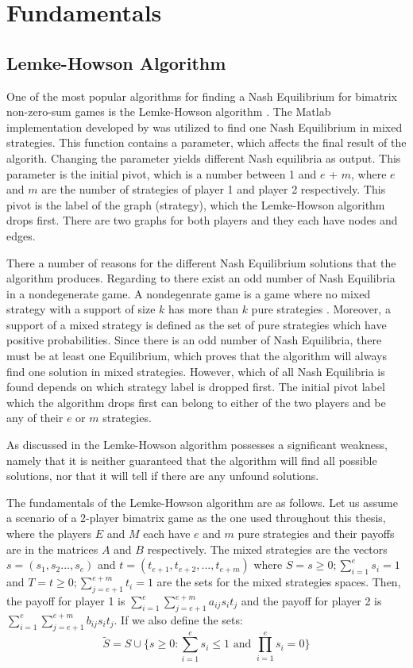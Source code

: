 \chapter{Fundamentals}
\label{chp:basics}

\section{Lemke-Howson Algorithm}
One of the most popular algorithms for finding a Nash Equilibrium for bimatrix non-zero-sum games is the Lemke-Howson algorithm \citep{lemke1964equilibrium}. The Matlab implementation developed by \citep{lemkeHowson2014Matlab} was utilized to find one Nash Equilibrium in mixed strategies. This function contains a parameter, which affects the final result of the algorith. Changing the parameter yields different Nash equilibria as output. This parameter is the initial pivot, which is a number between 1 and $e$ + $m$, where $e$ and $m$ are the number of strategies of player 1 and player 2 respectively. This pivot is the label of the graph (strategy), which the Lemke-Howson algorithm drops first. There are two graphs for both players and they each have nodes and edges.

There a number of reasons for the different Nash Equilibrium solutions that the algorithm produces. Regarding to \cite{lemke1964equilibrium} there exist an odd number of Nash Equilibria in a nondegenerate game. A nondegenrate game is a game where no mixed strategy with a support of size $k$ has more than $k$ pure strategies \citet{nisan2007algorithmic}. Moreover, a support of a mixed strategy is defined as the set of pure strategies which have positive probabilities. Since there is an odd number of Nash Equilibria, there must be at least one Equilibrium, which proves that the algorithm will always find one solution in mixed strategies. However, which of all Nash Equilibria is found depends on which strategy label is dropped first. The initial pivot label which the algorithm drops first can belong to either of the two players and be any of their $e$ or $m$ strategies.

As discussed in \citep{shapley1974note} the Lemke-Howson algorithm possesses a significant weakness, namely that it is neither guaranteed that the algorithm will find all possible solutions, nor that it will tell if there are any unfound solutions.

The fundamentals of the Lemke-Howson algorithm are as follows. Let us assume a scenario of a 2-player bimatrix game as the one used throughout this thesis, where the players $E$ and $M$ each have $e$ and $m$ pure strategies and their payoffs are in the matrices $A$ and $B$ respectively. The mixed strategies are the vectors $s=(s_1,s_2...,s_e)$ and $t=(t_{e+1},t_{e+2},...,t_{e+m})$ where $S = {s \geq 0; \sum_{i=1}^{e}s_i = 1}$ and $T = {t \geq 0; \sum_{j=e+1}^{e+m}t_i = 1}$ are the sets for the mixed strategies spaces. Then, the payoff for player 1 is $\sum_{i=1}^{e}\sum_{j=e+1}^{e+m} a_{ij} s_i t_j$ and the payoff for player 2 is $\sum_{i=1}^{e}\sum_{j=e+1}^{e+m} b_{ij} s_i t_j$.
If we also define the sets:
\[
\tilde{S} =  S \cup \{ s \geq 0: \sum_{i=1}^{e} s_i \leq 1 \text{ and } \prod_{i=1}^{e} s_i = 0 \}
\]

